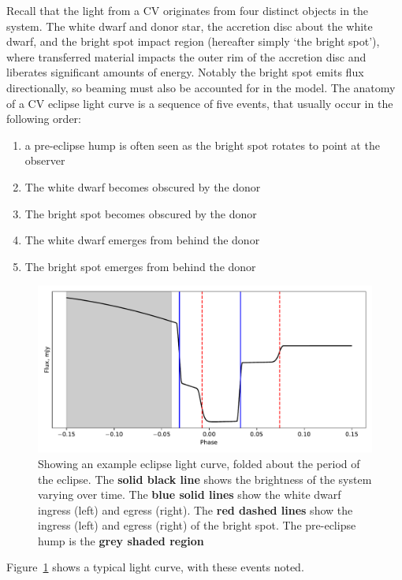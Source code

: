 Recall that the light from a CV originates from four distinct objects in the system. The white dwarf and donor star, the accretion disc about the white dwarf, and the bright spot impact region (hereafter simply `the bright spot'), where transferred material impacts the outer rim of the accretion disc and liberates significant amounts of energy. Notably the bright spot emits flux directionally, so beaming must also be accounted for in the model.
The anatomy of a CV eclipse light curve is a sequence of five events, that usually occur in the following order:
\begin{enumerate}
    \setlength\itemsep{0em}
    \item a pre-eclipse hump is often seen as the bright spot rotates to point at the observer
    \item The white dwarf becomes obscured by the donor
    \item The bright spot becomes obscured by the donor
    \item The white dwarf emerges from behind the donor
    \item The bright spot emerges from behind the donor
\end{enumerate}
\begin{figure}
    \centering
    \includegraphics[width=\textwidth]{figures/introduction/example_eclipse.pdf}
    \caption{Showing an example eclipse light curve, folded about the period of the eclipse. The {\bf solid black line} shows the brightness of the system varying over time. The {\bf blue solid lines} show the white dwarf ingress (left) and egress (right). The {\bf red dashed lines} show the ingress (left) and egress (right) of the bright spot. The pre-eclipse hump is the {\bf grey shaded region}}
    \label{fig:introduction:example labelled eclipse light curve}
\end{figure}
Figure~\ref{fig:introduction:example labelled eclipse light curve} shows a typical light curve, with these events noted.

